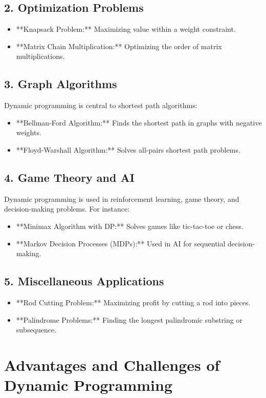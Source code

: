 \subsection*{2. Optimization Problems}
\begin{itemize}
    \item **Knapsack Problem:** Maximizing value within a weight constraint.
    \item **Matrix Chain Multiplication:** Optimizing the order of matrix multiplications.
\end{itemize}

\subsection*{3. Graph Algorithms}
Dynamic programming is central to shortest path algorithms:
\begin{itemize}
    \item **Bellman-Ford Algorithm:** Finds the shortest path in graphs with negative weights.
    \item **Floyd-Warshall Algorithm:** Solves all-pairs shortest path problems.
\end{itemize}

\subsection*{4. Game Theory and AI}
Dynamic programming is used in reinforcement learning, game theory, and decision-making problems. For instance:
\begin{itemize}
    \item **Minimax Algorithm with DP:** Solves games like tic-tac-toe or chess.
    \item **Markov Decision Processes (MDPs):** Used in AI for sequential decision-making.
\end{itemize}

\subsection*{5. Miscellaneous Applications}
\begin{itemize}
    \item **Rod Cutting Problem:** Maximizing profit by cutting a rod into pieces.
    \item **Palindrome Problems:** Finding the longest palindromic substring or subsequence.
\end{itemize}

\section*{Advantages and Challenges of Dynamic Programming}

